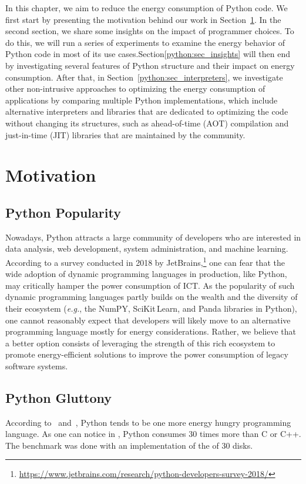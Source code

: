 In this chapter, we aim to reduce the energy consumption of Python code.
We first start by presenting the motivation behind our work in Section~\ref{python:sec_motivation}.
In the second section, we share some insights on the impact of programmer choices. To do this, we will run a series of experiments to examine the energy behavior of Python code in most of its use cases.Section\ref{python:sec_insights} will then end by investigating several features of Python structure and their impact on energy consumption.
After that, in Section~\ref{python:sec_interpreters}, we investigate other non-intrusive approaches to optimizing the energy consumption of applications by comparing multiple Python implementations, which include alternative interpreters and libraries that are dedicated to optimizing the code without changing its structures, such as ahead-of-time (AOT) compilation and just-in-time (JIT) libraries that are maintained by the community.


\section{Motivation}\label{python:sec_motivation}

\subsection{Python Popularity}
Nowadays, Python attracts a large community of developers who are interested in data analysis, web development, system administration, and machine learning.
According to a survey conducted in 2018 by JetBrains,\footnote{\url{https://www.jetbrains.com/research/python-developers-survey-2018/}} one can fear that the wide adoption of dynamic programming languages in production, like Python, may critically hamper the power consumption of ICT.
As the popularity of such dynamic programming languages partly builds on the wealth and the diversity of their ecosystem (\emph{e.g.}, the NumPY, SciKit\,Learn, and Panda libraries in Python), one cannot reasonably expect that developers will likely move to an alternative programming language mostly for energy considerations.
Rather, we believe that a better option consists of leveraging the strength of this rich ecosystem to promote energy-efficient solutions to improve the power consumption of legacy software systems.

\subsection{Python Gluttony}
According to~\cite{pinto_energy_2017} and~\cite{noureddine_preliminary_2012}, Python tends to be one more energy hungry programming language.
As one can notice in , Python consumes $30$ times more than C or C++.
The benchmark was done with an implementation of the  of 30 disks.

